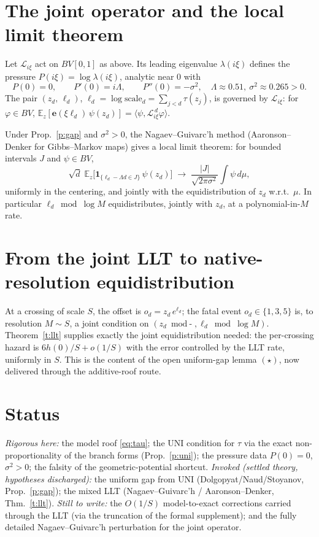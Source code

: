 \documentclass[11pt]{article}
\theoremstyle{remark}\newtheorem{remark}{Remark}
\newcommand{\Lop}{\mathcal L}\newcommand{\e}{\mathbf e}
\begin{document}
\section{The joint operator and the local limit theorem}
Let $\Lop_{i\xi}$ act on $BV[0,1]$ as above. Its leading eigenvalue $\lambda(i\xi)$
defines the pressure $P(i\xi)=\log\lambda(i\xi)$, analytic near $0$ with
\[
P(0)=0,\qquad P'(0)=i\Lambda,\qquad P''(0)=-\sigma^2,\quad \Lambda\approx0.51,\ \sigma^2\approx0.265>0.
\]
The pair $(z_d,\,\ell_d)$, $\ell_d=\log\text{scale}_d=\sum_{j<d}\tau(z_j)$,
is governed by $\Lop_{i\xi}$: for $\varphi\in BV$,
$\mathbb E_z[\e(\xi\ell_d)\,\psi(z_d)]=\langle\psi,\Lop_{i\xi}^{\,d}\varphi\rangle$.
\begin{theorem}\label{t:llt}
Under Prop.~\ref{p:gap} and $\sigma^2>0$, the Nagaev--Guivarc'h method
(Aaronson--Denker for Gibbs--Markov maps) gives a local limit theorem: for
bounded intervals $J$ and $\psi\in BV$,
\[
\sqrt{d}\;\mathbb E_z\big[\mathbf 1_{\{\ell_d-\Lambda d\in J\}}\,\psi(z_d)\big]
\;\longrightarrow\;\frac{|J|}{\sqrt{2\pi\sigma^2}}\int\psi\,d\mu,
\]
uniformly in the centering, and jointly with the equidistribution of $z_d$
w.r.t.\ $\mu$. In particular $\ell_d\bmod\log M$ equidistributes, jointly with
$z_d$, at a polynomial-in-$M$ rate.
\end{theorem}

\section{From the joint LLT to native-resolution equidistribution}
At a crossing of scale $S$, the offset is $o_d=z_d\,e^{\ell_d}$; the fatal
event $o_d\in\{1,3,5\}$ is, to resolution $M\sim S$, a joint condition on
$(z_d\bmod\text{-},\ell_d\bmod\log M)$. Theorem~\ref{t:llt} supplies exactly
the joint equidistribution needed: the per-crossing hazard is
$6h(0)/S+o(1/S)$ with the error controlled by the LLT rate, uniformly in $S$.
This is the content of the open uniform-gap lemma $(\star)$, now delivered
through the additive-roof route.

\section{Status}
\emph{Rigorous here:} the model roof \eqref{eq:tau}; the UNI condition for
$\tau$ via the exact non-proportionality of the branch forms
(Prop.~\ref{p:uni}); the pressure data $P(0)=0$, $\sigma^2>0$; the falsity of
the geometric-potential shortcut. \emph{Invoked (settled theory, hypotheses
discharged):} the uniform gap from UNI (Dolgopyat/Naud/Stoyanov,
Prop.~\ref{p:gap}); the mixed LLT (Nagaev--Guivarc'h / Aaronson--Denker,
Thm.~\ref{t:llt}). \emph{Still to write:} the $O(1/S)$ model-to-exact
corrections carried through the LLT (via the truncation of the formal
supplement); and the fully detailed Nagaev--Guivarc'h perturbation for the
joint operator.
\end{document}
